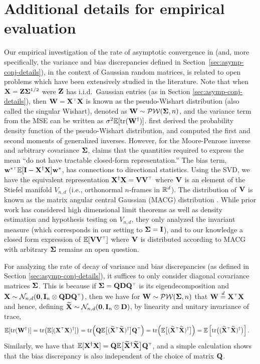 \section{Additional details for empirical evaluation}
\label{a:empirical}

Our empirical investigation of the rate of asymptotic convergence in  (and, more
specifically, the variance and bias discrepancies defined in
Section~\ref{sec:asymp-conj-details}), in the context of
Gaussian random matrices, is related to open problems which have been
extensively studied in the literature. Note that when
$\mathbf X=\mathbf Z\mathbf{\Sigma}^{1/2}$ were $\mathbf Z$ has i.i.d.~Gaussian entries (as in
Section \ref{sec:asymp-conj-details}), then $\W=\X^\top\X$ is known as the
pseudo-Wishart distribution (also called the singular Wishart),
denoted as $\mathbf W \sim \mathcal{P}\mathcal{W}(\mathbf{\Sigma}, n)$, and the variance
term from the MSE can be written as $\sigma^2\mathbb E[\mathrm{tr}(\mathbf W^\dagger)]$.
\cite{srivastava2003} first derived the probability density function of the
pseudo-Wishart distribution, and
\cite{cook2011} computed the first and second moments of generalized
inverses. However, for the Moore-Penrose inverse and arbitrary 
covariance $\mathbf{\Sigma}$, \cite{cook2011} claims that the quantities required to
express the mean ``do not have tractable closed-form representation.''
The bias term, $\w^{*\top}\E[\I-\X^\dagger\X]\w^*$, has connections to
directional statistics.  Using the SVD, 
we have the equivalent representation $\X^\dagger \X = \V \V^\top$ where $\mathbf V$
is an element of the Stiefel manifold $V_{n,d}$ (i.e., orthonormal $n$-frames
in $\mathbb R^d$).  The distribution of $\mathbf V$ is known as the matrix angular central
Gaussian (MACG) distribution \citep{chikuse1990matrix}. While prior work has
considered high dimensional limit theorems \citep{CHIKUSE1991145} as well as
density estimation and hypothesis testing \citep{CHIKUSE1998188} on $V_{n,d}$,
they only analyzed the invariant measure (which corresponds in our setting to
$\mathbf{\Sigma} = \mathbf I$), and to our knowledge a closed form expression of
$\E[\V\V^\top]$ where $\mathbf V$ is distributed according to MACG with arbitrary
$\mathbf{\Sigma}$ remains an open question.

For analyzing the rate of decay of variance and bias discrepancies (as
defined in Section \ref{sec:asymp-conj-details}), it suffices to only consider diagonal
covariance matrices $\mathbf{\Sigma}$.  This is because if $\Sigmab = \Q \D \Q^\top$ is
its eigendecomposition and $\X\sim\Nc_{n,d}(\zero, \I_n \otimes \Q\D\Q^\top)$,
then we have for $\mathbf W \sim \mathcal{P}\mathcal{W}(\mathbf{\Sigma}, n)$ that $\W \overset{d}{=} \X^\top
\X$ and hence, defining $\widetilde{\mathbf{X}}\sim\mathcal{N}_{n,d}(\mathbf 0,\mathbf I_n \otimes \mathbf D)$, by linearity
and unitary invariance of trace,
\begin{align*}
  \E[\tr(\W^\dagger)]
  &= \tr\big( \E[(\X^\top\X)^\dagger] \big)
  = \tr\Big( \Q\E\big[(\Xt^\top\Xt)^\dagger\big]\Q^\top \Big)
  = \tr\Big( \E\big[(\Xt^\top\Xt)^\dagger\big] \Big)
  = \E\left[\tr \big((\Xt^\top\Xt)^\dagger\big) \right].
\end{align*}
Similarly, we have that $\E[\X^\dagger\X]=\Q\E\big[\Xt^\dagger\Xt\big]\Q^\top$,
and a simple calculation shows that the bias discrepancy is
also independent of the choice of matrix $\mathbf Q$.

